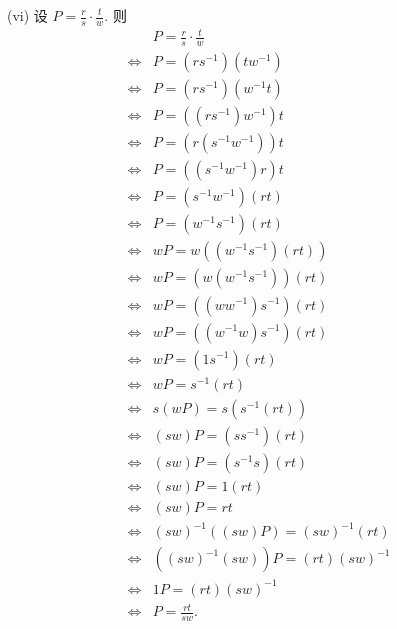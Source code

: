 \begin{pf}
    (vi) 设 $P = \frac{r}{s} \cdot \frac{t}{w}$. 则
    \begin{align*}
                & P = \frac{r}{s} \cdot \frac{t}{w}  \\
        \iff {} & P = (rs^{-1}) (tw^{-1})            \\
        \iff {} & P = (rs^{-1}) (w^{-1}t)            \\
        \iff {} & P = ((rs^{-1}) w^{-1}) t           \\
        \iff {} & P = (r (s^{-1} w^{-1})) t          \\
        \iff {} & P = ((s^{-1} w^{-1}) r) t          \\
        \iff {} & P = (s^{-1} w^{-1}) (rt)           \\
        \iff {} & P = (w^{-1} s^{-1}) (rt)           \\
        \iff {} & wP = w ((w^{-1} s^{-1}) (rt))      \\
        \iff {} & wP = (w (w^{-1} s^{-1})) (rt)      \\
        \iff {} & wP = ((ww^{-1}) s^{-1}) (rt)       \\
        \iff {} & wP = ((w^{-1}w) s^{-1}) (rt)       \\
        \iff {} & wP = (1s^{-1}) (rt)                \\
        \iff {} & wP = s^{-1} (rt)                   \\
        \iff {} & s(wP) = s(s^{-1} (rt))             \\
        \iff {} & (sw)P = (ss^{-1}) (rt)             \\
        \iff {} & (sw)P = (s^{-1}s) (rt)             \\
        \iff {} & (sw)P = 1(rt)                      \\
        \iff {} & (sw)P = rt                         \\
        \iff {} & (sw)^{-1} ((sw)P) = (sw)^{-1} (rt) \\
        \iff {} & ((sw)^{-1} (sw))P = (rt) (sw)^{-1} \\
        \iff {} & 1P = (rt) (sw)^{-1}                \\
        \iff {} & P = \frac{rt}{sw}.
    \end{align*}


\end{pf}
